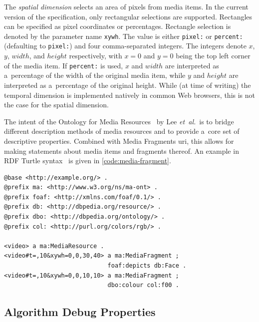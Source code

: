 The \emph{spatial dimension} selects an area of pixels from media items.
In the current version of the specification,
only rectangular selections are supported.
Rectangles can be specified as pixel coordinates or percentages.
Rectangle selection is denoted by the parameter name \texttt{xywh}.
The value is either \texttt{pixel:} or \texttt{percent:}
(defaulting to \texttt{pixel:}) and four comma-separated integers.
The integers denote $x$, $y$, $width$, and $height$ respectively,
with $x = 0$ and $y = 0$ being the top left corner of the media item.
If \texttt{percent:} is used,
$x$ and $width$ are interpreted as a~percentage of the width of the original media item,
while $y$ and $height$ are interpreted as a~percentage of the original height.
While (at time of writing) the temporal dimension is implemented natively
in common Web browsers, this is not the case for the spatial dimension.

The intent of the Ontology for Media Resources~\cite{lee2012mediaontology}
by Lee \emph{et~al.}\ is to bridge different description methods of media resources
and to provide a~core set of descriptive properties.
Combined with Media Fragments {\sc uri}, this allows for making statements
about media items and fragments thereof.
An example in RDF Turtle syntax~\cite{prudhommeaux2013turtle}
is given in \autoref{code:media-fragment}.

\begin{lstlisting}[caption={[Description of two 10~sec long media fragments]{Description of two 10~sec long media fragments:
  \textit{(i)}~a~tile of dimensions $ 30 \times 40 $ pixels
  starting at pixel coordinates $ (0, 0) $
  that contains a~face; and
  \textit{(ii)}~a~tile of dimensions $ 10 \times 10 $ pixels
  starting at pixel coordinates $ (0, 0) $ of red color}},
  label=code:media-fragment, float=!ht]
@base <http://example.org/> .
@prefix ma: <http://www.w3.org/ns/ma-ont> .
@prefix foaf: <http://xmlns.com/foaf/0.1/> .
@prefix db: <http://dbpedia.org/resource/> .
@prefix dbo: <http://dbpedia.org/ontology/> .
@prefix col: <http://purl.org/colors/rgb/> .

<video> a ma:MediaResource .
<video#t=,10&xywh=0,0,30,40> a ma:MediaFragment ;
                             foaf:depicts db:Face .
<video#t=,10&xywh=0,0,10,10> a ma:MediaFragment ;
                             dbo:colour col:f00 .
\end{lstlisting}

\subsection{Algorithm Debug Properties}
\label{sec:media-item-deduplication-algorithm}

